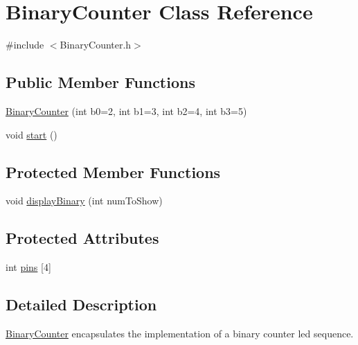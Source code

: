 \hypertarget{class_binary_counter}{\section{Binary\-Counter Class Reference}
\label{class_binary_counter}
}


{\ttfamily \#include $<$Binary\-Counter.\-h$>$}

\subsection*{Public Member Functions}
\begin{DoxyCompactItemize}
\item 
\hyperlink{class_binary_counter_abc422048cc3eb768f84cf3d33280b90c}{Binary\-Counter} (int b0=2, int b1=3, int b2=4, int b3=5)
\item 
void \hyperlink{class_binary_counter_ab8a068a8d01ecfc0c2ca0226c2aebb26}{start} ()
\end{DoxyCompactItemize}
\subsection*{Protected Member Functions}
\begin{DoxyCompactItemize}
\item 
void \hyperlink{class_binary_counter_a4609151e73e2235a4520b439c5faf13d}{display\-Binary} (int num\-To\-Show)
\end{DoxyCompactItemize}
\subsection*{Protected Attributes}
\begin{DoxyCompactItemize}
\item 
int \hyperlink{class_binary_counter_aa6ef09d4b8d95af24c0ddfb45d643982}{pins} \mbox{[}4\mbox{]}
\end{DoxyCompactItemize}


\subsection{Detailed Description}
\hyperlink{class_binary_counter}{Binary\-Counter} encapsulates the implementation of a binary counter led sequence. 

